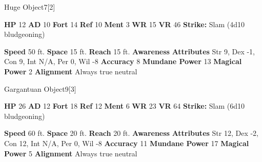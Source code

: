   

  \begin{monsubsection}{Huge Object}{7}[2]
    \vspace{-1em}\vspace{-1em}
    \vspace{0em}

    
    

    \begin{spellcontent}
      \begin{spelltargetinginfo}
        \pari \textbf{HP} 12 \monsep
          \textbf{AD} 10 \monsep
          \textbf{Fort} 14 \monsep
          \textbf{Ref} 10 \monsep
          \textbf{Ment} 3
        \pari \textbf{WR} 15 \monsep
        \textbf{VR} 46
        \pari \textbf{Strike:}
            Slam  (4d10 bludgeoning)
      \end{spelltargetinginfo}
    \end{spellcontent}
    \begin{monsterfooter}
      \pari \textbf{Speed} 50 ft. \monsep
        \textbf{Space} 15 ft. \monsep
        \textbf{Reach} 15 ft.
      \pari \textbf{Awareness} 
      \pari \textbf{Attributes}
        Str 9, Dex -1,
        Con 9, Int N/A,
        Per 0, Wil -8
      \pari \textbf{Accuracy} 8 \monsep
        \textbf{Mundane Power} 13 \monsep
      \textbf{Magical Power} 2
      \pari \textbf{Alignment} Always true neutral
    \end{monsterfooter}
  \end{monsubsection}
  
  

  \begin{monsubsection}{Gargantuan Object}{9}[3]
    \vspace{-1em}\vspace{-1em}
    \vspace{0em}

    
    

    \begin{spellcontent}
      \begin{spelltargetinginfo}
        \pari \textbf{HP} 26 \monsep
          \textbf{AD} 12 \monsep
          \textbf{Fort} 18 \monsep
          \textbf{Ref} 12 \monsep
          \textbf{Ment} 6
        \pari \textbf{WR} 23 \monsep
        \textbf{VR} 64
        \pari \textbf{Strike:}
            Slam  (6d10 bludgeoning)
      \end{spelltargetinginfo}
    \end{spellcontent}
    \begin{monsterfooter}
      \pari \textbf{Speed} 60 ft. \monsep
        \textbf{Space} 20 ft. \monsep
        \textbf{Reach} 20 ft.
      \pari \textbf{Awareness} 
      \pari \textbf{Attributes}
        Str 12, Dex -2,
        Con 12, Int N/A,
        Per 0, Wil -8
      \pari \textbf{Accuracy} 11 \monsep
        \textbf{Mundane Power} 17 \monsep
      \textbf{Magical Power} 5
      \pari \textbf{Alignment} Always true neutral
    \end{monsterfooter}
  \end{monsubsection}
  
